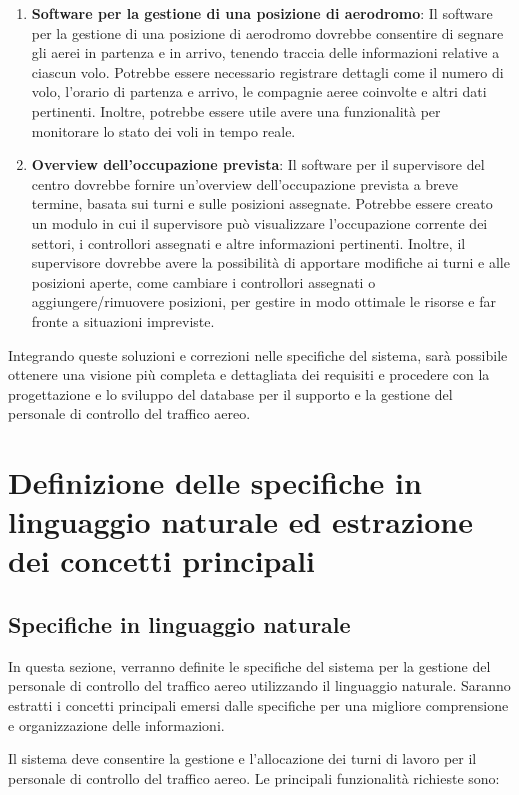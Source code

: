 \begin{enumerate}
\item \textbf{Software per la gestione di una posizione di aerodromo}: Il software per la gestione di una posizione di aerodromo dovrebbe consentire di segnare gli aerei in partenza e in arrivo, tenendo traccia delle informazioni relative a ciascun volo. Potrebbe essere necessario registrare dettagli come il numero di volo, l'orario di partenza e arrivo, le compagnie aeree coinvolte e altri dati pertinenti. Inoltre, potrebbe essere utile avere una funzionalità per monitorare lo stato dei voli in tempo reale.

\item \textbf{Overview dell'occupazione prevista}: Il software per il supervisore del centro dovrebbe fornire un'overview dell'occupazione prevista a breve termine, basata sui turni e sulle posizioni assegnate. Potrebbe essere creato un modulo in cui il supervisore può visualizzare l'occupazione corrente dei settori, i controllori assegnati e altre informazioni pertinenti. Inoltre, il supervisore dovrebbe avere la possibilità di apportare modifiche ai turni e alle posizioni aperte, come cambiare i controllori assegnati o aggiungere/rimuovere posizioni, per gestire in modo ottimale le risorse e far fronte a situazioni impreviste.
\end{enumerate}

Integrando queste soluzioni e correzioni nelle specifiche del sistema, sarà possibile ottenere una visione più completa e dettagliata dei requisiti e procedere con la progettazione e lo sviluppo del database per il supporto e la gestione del personale di controllo del traffico aereo.



\section{Definizione delle specifiche in linguaggio naturale ed estrazione dei concetti principali}
\subsection{Specifiche in linguaggio naturale}
In questa sezione, verranno definite le specifiche del sistema per la gestione del personale di controllo del traffico aereo utilizzando il linguaggio naturale. Saranno estratti i concetti principali emersi dalle specifiche per una migliore comprensione e organizzazione delle informazioni.

Il sistema deve consentire la gestione e l'allocazione dei turni di lavoro per il personale di controllo del traffico aereo. Le principali funzionalità richieste sono:

